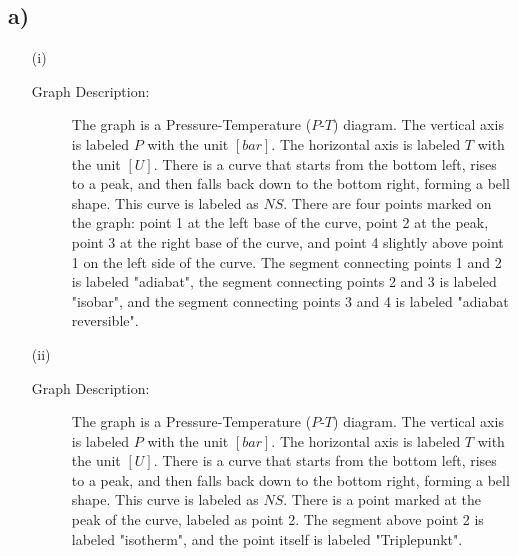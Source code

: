 

\subsection*{a)}

\begin{itemize}
    \item[(i)] 
    \begin{description}
        \item[Graph Description:] 
        The graph is a Pressure-Temperature ($P$-$T$) diagram. The vertical axis is labeled $P$ with the unit $[bar]$. The horizontal axis is labeled $T$ with the unit $[U]$. There is a curve that starts from the bottom left, rises to a peak, and then falls back down to the bottom right, forming a bell shape. This curve is labeled as $NS$. There are four points marked on the graph: point 1 at the left base of the curve, point 2 at the peak, point 3 at the right base of the curve, and point 4 slightly above point 1 on the left side of the curve. The segment connecting points 1 and 2 is labeled "adiabat", the segment connecting points 2 and 3 is labeled "isobar", and the segment connecting points 3 and 4 is labeled "adiabat reversible".
    \end{description}

    \item[(ii)] 
    \begin{description}
        \item[Graph Description:] 
        The graph is a Pressure-Temperature ($P$-$T$) diagram. The vertical axis is labeled $P$ with the unit $[bar]$. The horizontal axis is labeled $T$ with the unit $[U]$. There is a curve that starts from the bottom left, rises to a peak, and then falls back down to the bottom right, forming a bell shape. This curve is labeled as $NS$. There is a point marked at the peak of the curve, labeled as point 2. The segment above point 2 is labeled "isotherm", and the point itself is labeled "Triplepunkt".
    \end{description}
\end{itemize}